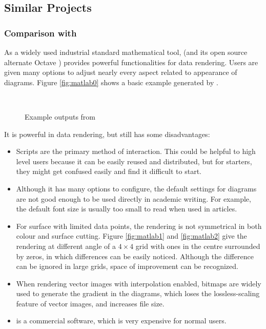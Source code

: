 \subsection{Similar Projects}

\subsubsection{Comparison with \MatLab{}}

As a widely used industrial standard mathematical tool, \MatLab{} (and its open source alternate Octave \cite{ref:octave}) provides powerful functionalities for data rendering. Users are given many options to adjust nearly every aspect related to appearance of diagrams. Figure \ref{fig:matlab0} shows a basic example generated by \MatLab{}.

\begin{figure}[tb]
	\centering
	 \\
	\caption{Example outputs from \MatLab}
	\label{fig:octave}
\end{figure}

It is powerful in data rendering, but still has some disadvantages:
%
\begin{itemize}
	\item Scripts are the primary method of interaction. This could be helpful to high level users because it can be easily reused and distributed, but for starters, they might get confused easily and find it difficult to start.
	\item Although it has many options to configure, the default settings for diagrams are not good enough to be used directly in academic writing. For example, the default font size is usually too small to read when used in articles.
	\item For surface with limited data points, the rendering is not symmetrical in both colour and surface cutting. Figure \ref{fig:matlab1} and \ref{fig:matlab2} give the rendering at different angle of a $4\times4$ grid with ones in the centre surrounded by zeros, in which differences can be easily noticed. Although the difference can be ignored in large grids, space of improvement can be recognized.
	\item When rendering vector images with interpolation enabled, bitmaps are widely used to generate the gradient in the diagrams, which loses the lossless-scaling feature of vector images, and increases file size.
	\item \MatLab{} is a commercial software, which is very expensive for normal users.
\end{itemize}

